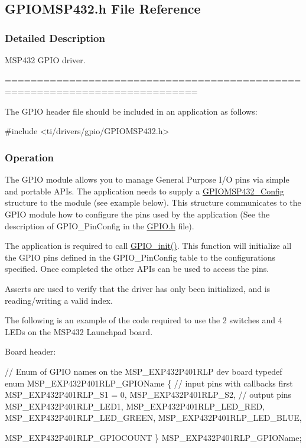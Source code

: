 \subsection{G\+P\+I\+O\+M\+S\+P432.\+h File Reference}
\label{_g_p_i_o_m_s_p432_8h}


\subsubsection{Detailed Description}
M\+S\+P432 G\+P\+I\+O driver. 

============================================================================

The G\+P\+I\+O header file should be included in an application as follows\+: 
\begin{DoxyCode}
\textcolor{preprocessor}{#include <ti/drivers/gpio/GPIOMSP432.h>}
\end{DoxyCode}


\subsubsection*{Operation}

The G\+P\+I\+O module allows you to manage General Purpose I/\+O pins via simple and portable A\+P\+Is. The application needs to supply a \hyperlink{struct_g_p_i_o_m_s_p432___config}{G\+P\+I\+O\+M\+S\+P432\+\_\+\+Config} structure to the module (see example below). This structure communicates to the G\+P\+I\+O module how to configure the pins used by the application (See the description of G\+P\+I\+O\+\_\+\+Pin\+Config in the \hyperlink{_g_p_i_o_8h}{G\+P\+I\+O.\+h} file).

The application is required to call \hyperlink{_g_p_i_o_8h_a7aaec489dca5ac4d278d2eb3ae38a2d2}{G\+P\+I\+O\+\_\+init()}. This function will initialize all the G\+P\+I\+O pins defined in the G\+P\+I\+O\+\_\+\+Pin\+Config table to the configurations specified. Once completed the other A\+P\+Is can be used to access the pins.

Asserts are used to verify that the driver has only been initialized, and is reading/writing a valid index.

The following is an example of the code required to use the 2 switches and 4 L\+E\+Ds on the M\+S\+P432 Launchpad board.

Board header\+: 
\begin{DoxyCode}
\textcolor{comment}{// Enum of GPIO names on the MSP\_EXP432P401RLP dev board}
\textcolor{keyword}{typedef} \textcolor{keyword}{enum} MSP\_EXP432P401RLP\_GPIOName \{
    \textcolor{comment}{// input pins with callbacks first}
    MSP\_EXP432P401RLP\_S1 = 0,
    MSP\_EXP432P401RLP\_S2,
    \textcolor{comment}{// output pins}
    MSP\_EXP432P401RLP\_LED1,
    MSP\_EXP432P401RLP\_LED\_RED,
    MSP\_EXP432P401RLP\_LED\_GREEN,
    MSP\_EXP432P401RLP\_LED\_BLUE,

    MSP\_EXP432P401RLP\_GPIOCOUNT
\} MSP\_EXP432P401RLP\_GPIOName;
\end{DoxyCode}


